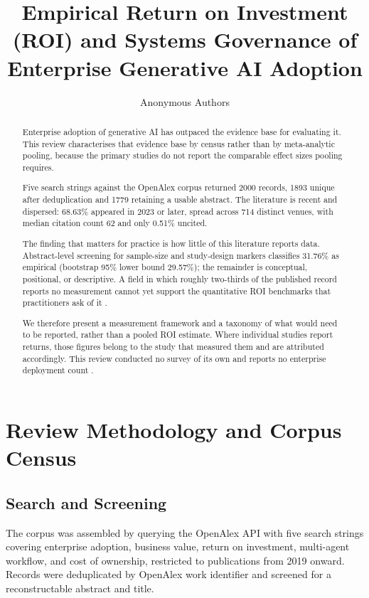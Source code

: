 \documentclass{article}
\title{Empirical Return on Investment (ROI) and Systems Governance of Enterprise Generative AI Adoption}
\author{
  Anonymous Authors
}
\begin{document}
\maketitle

\begin{abstract}
Enterprise adoption of generative AI has outpaced the evidence base for evaluating it. This review characterises that evidence base by census rather than by meta-analytic pooling, because the primary studies do not report the comparable effect sizes pooling requires.

Five search strings against the OpenAlex corpus returned 2000 records, 1893 unique after deduplication and 1779 retaining a usable abstract. The literature is recent and dispersed: 68.63\% appeared in 2023 or later, spread across 714 distinct venues, with median citation count 62 and only 0.51\% uncited.

The finding that matters for practice is how little of this literature reports data. Abstract-level screening for sample-size and study-design markers classifies 31.76\% as empirical (bootstrap 95\% lower bound 29.57\%); the remainder is conceptual, positional, or descriptive. A field in which roughly two-thirds of the published record reports no measurement cannot yet support the quantitative ROI benchmarks that practitioners ask of it \cite{crossref_10_2139_ssrn_6374778}.

We therefore present a measurement framework and a taxonomy of what would need to be reported, rather than a pooled ROI estimate. Where individual studies report returns, those figures belong to the study that measured them and are attributed accordingly. This review conducted no survey of its own and reports no enterprise deployment count \cite{openalex_w4400993506}.
\end{abstract}




\section{Review Methodology and Corpus Census}



\subsection{Search and Screening}


The corpus was assembled by querying the OpenAlex API with five search strings covering enterprise adoption, business value, return on investment, multi-agent workflow, and cost of ownership, restricted to publications from 2019 onward. Records were deduplicated by OpenAlex work identifier and screened for a reconstructable abstract and title.
\end{document}

